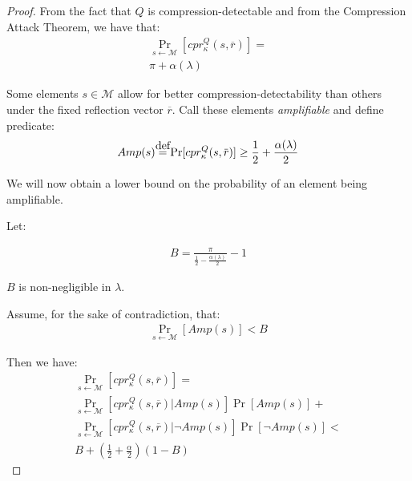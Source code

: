 \begin{proof}

From the fact that $Q$ is compression-detectable and from the Compression Attack Theorem, we have that:
\begin{align*}
    \Pr_{s \leftarrow \mathcal{M}}
         [cpr^Q_{\kappa}(s, \overbar{r})]
    =\\
    \pi + \alpha(\lambda)
\end{align*}

Some elements $s \in \mathcal{M}$ allow for better compression-detectability than others under the fixed
reflection vector $\overbar{r}$. Call these elements \textit{amplifiable} and define predicate:
\begin{align*}
    Amp(s) \defeq
    \Pr[cpr^Q_{\kappa}
     (s, \overbar{r})]
    \geq
    \frac{1}{2} + \frac{\alpha(\lambda)}{2}
\end{align*}

We will now obtain a lower bound on the probability of an element being amplifiable.

Let:

\begin{align*}
    B = \frac{\pi}{\frac{1}{2} - \frac{\alpha(\lambda)}{2}} - 1
\end{align*}

$B$ is non-negligible in $\lambda$.

Assume, for the sake of contradiction, that:
\begin{align*}
    \Pr_{s \leftarrow \mathcal{M}}
    [Amp(s)] < B
\end{align*}

Then we have:
\begin{align*}
    \Pr_{s \leftarrow \mathcal{M}}
         [cpr^Q_{\kappa}(s, \overbar{r})]
    =\\
    \Pr_{s \leftarrow \mathcal{M}}
         [cpr^Q_{\kappa}(s, \overbar{r})|Amp(s)]\Pr[Amp(s)]
    +\\
    \Pr_{s \leftarrow \mathcal{M}}
         [cpr^Q_{\kappa}(s, \overbar{r})|\lnot Amp(s)]\Pr[\lnot Amp(s)]
    <\\
    B + (\frac{1}{2} + \frac{\alpha}{2})(1 - B)
\end{align*}


\end{proof}
